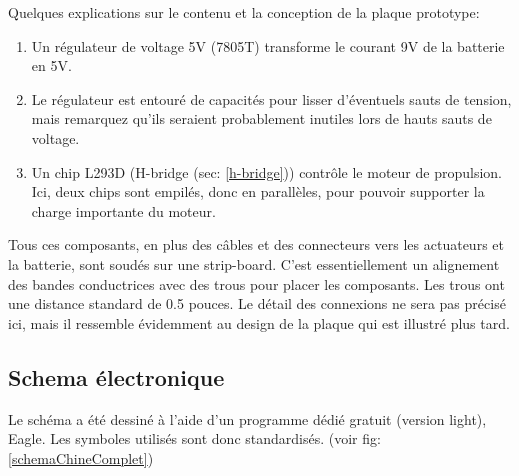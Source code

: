 \documentclass[a4paper,11pt]{report}
\begin{document}
{\begin{enumerate}
\begin{enumerate}
Quelques explications sur le contenu et la conception de la plaque prototype:

\begin{enumerate}
	\item Un régulateur de voltage 5V (7805T) transforme le courant 9V de
          la batterie en 5V. 

	\item Le régulateur est entouré de capacités pour lisser d'éventuels
          sauts de tension, mais remarquez qu'ils seraient probablement
          inutiles lors de hauts sauts de voltage. 

	\item Un chip L293D (H-bridge (sec: \ref{h-bridge})) contrôle le
          moteur de propulsion. Ici, deux chips sont empilés, donc en
          parallèles, pour pouvoir supporter la charge importante du moteur. 
\end{enumerate}

Tous ces composants, en plus des câbles et des connecteurs vers les actuateurs
et la batterie, sont soudés sur une strip-board. C'est essentiellement un alignement des bandes conductrices avec des trous pour placer les
composants. Les trous ont une distance standard de 0.5 pouces. Le détail des
connexions ne sera pas précisé ici, mais il ressemble évidemment 
au design de la plaque qui est illustré plus tard.   


\subsection{Schema électronique}
Le schéma a été dessiné à l'aide d'un programme dédié gratuit (version light),
Eagle. Les symboles utilisés sont donc standardisés.
(voir fig: \ref{schemaChineComplet})


\end{enumerate}
\end{enumerate}}
\end{document}
